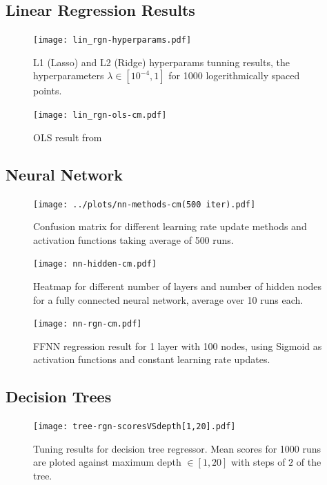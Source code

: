 \documentclass[english,notitlepage,reprint,nofootinbib]{revtex4-1}
\begin{document}
\subsection{Linear Regression Results}

\begin{figure}[H]
	\centering
	\texttt{[image: lin\_rgn-hyperparams.pdf]}
	\caption{L1 (Lasso) and L2 (Ridge) hyperparams tunning results, the hyperparameters $ \lambda \in [10^{-4}, 1]$ for 1000 logerithmically spaced points.}
	\label{fig:lintune}
\end{figure}

\begin{figure}[H]
	\centering
	\texttt{[image: lin\_rgn-ols-cm.pdf]}
	\caption{OLS result from }
	\label{fig:olscm}
\end{figure}


\subsection{Neural Network}
\begin{figure}[H]
	\centering
	\texttt{[image: ../plots/nn-methods-cm(500 iter).pdf]}
	\caption{Confusion matrix for different learning rate update methods and activation functions taking average of 500 runs.}
	\label{fig:nn-method}
\end{figure}

\begin{figure}[H]
	\centering
	\texttt{[image: nn-hidden-cm.pdf]}
	\caption{Heatmap for different number of layers and number of hidden nodes for a fully connected neural network, average over 10 runs each.}
	\label{fig:nn-hidden}
\end{figure}

\begin{figure}[H]
	\centering
	\texttt{[image: nn-rgn-cm.pdf]}
	\caption{FFNN regression result for 1 layer with 100 nodes, using Sigmoid as activation functions and constant learning rate updates.}
	\label{fig:nn-rgn-cm}
\end{figure}

\subsection{Decision Trees}

\begin{figure}[H]
	\centering
	\texttt{[image: tree-rgn-scoresVSdepth[1,20].pdf]}
	\caption{Tuning results for decision tree regressor. Mean scores for 1000 runs are ploted against maximum depth $ \in [1,20] $  with steps of $ 2 $  of the tree. }
	\label{fig:tree-rgn-tune}
\end{figure}
\end{document}
